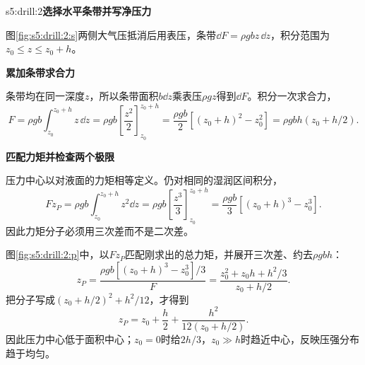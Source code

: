 \begin{drillsolution}{s5:drill:2}\textbf{选择水平条带并写净压力}\par\nobreak
图\ref{fig:s5:drill:2:s}两侧大气压抵消后用表压，条带$\dd F=\rho gbz\,\dd z$，积分范围为 $z_0\le z\le z_0+h$。


\par\medskip{}\noindent\textbf{累加条带求合力}\par\nobreak
条带均在同一深度$z$，所以条带面积$b\dd z$乘表压$\rho gz$得到$\dd F$。积分一次求合力，
\[
F=\rho gb\int_{z_0}^{z_0+h}z\,\dd z
=\rho gb\left[\frac{z^2}{2}\right]_{z_0}^{z_0+h}
=\frac{\rho gb}{2}[(z_0+h)^2-z_0^2]
=\rho gbh(z_0+h/2).
\]


\par\medskip{}\noindent\textbf{匹配力矩并检查两个极限}\par\nobreak
压力中心以对液面的力矩相等定义。仍对相同的湿润区间积分，
\[Fz_P=\rho gb\int_{z_0}^{z_0+h}z^2\dd z
 =\rho gb\left[\frac{z^3}{3}\right]_{z_0}^{z_0+h}
 =\frac{\rho gb}{3}[(z_0+h)^3-z_0^3].\]
因此力矩分子必须用三次差而不是二次差。

图\ref{fig:s5:drill:2:p}中，以$Fz_P$匹配刚求出的总力矩，并展开三次差、约去$\rho gbh$：
\[
z_P=\frac{\rho gb[(z_0+h)^3-z_0^3]/3}{F}
=\frac{z_0^2+z_0h+h^2/3}{z_0+h/2}.
\]
把分子写成$(z_0+h/2)^2+h^2/12$，才得到
\[
z_P=z_0+\frac h2+\frac{h^2}{12(z_0+h/2)}.
\]
因此压力中心低于面积中心；$z_0=0$时给$2h/3$，$z_0\gg h$时趋近中心，反映压强分布趋于均匀。\end{drillsolution}
